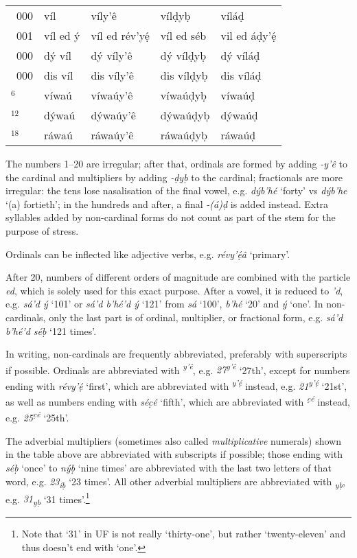 \documentclass[a4paper, 12pt, twoside, openright, final]{book}
\let \nf \normalfont
\let \w \textit
\let \Sub \textsubscript
\let \Sup \textsuperscript
\begin{document}
{\begin{longtable}{>{\nf}l|l|l|l|l}
    1~000  & víl             & víly’ê             & vílḍyḅ            & víláḍ           \\
    1~001  & víl ed ý        & víl ed rév’yẹ́      & víl ed séb        & vil ed áḍy’ẹ́    \\
    2~000  & dý víl          & dý víly’ê          & dý vílḍyḅ         & dý víláḍ        \\
    10~000 & dis víl         & dis víly’ê         & dis vílḍyḅ        & dis víláḍ       \\
    10$^6$ & víwaú           & víwaúy’ê           & víwaúḍyḅ          & víwaúḍ          \\
    10$^{12}$& dýwaú         & dýwaúy’ê           & dýwaúḍyḅ          & dýwaúḍ          \\
    10$^{18}$& ráwaú         & ráwaúy’ê           & ráwaúḍyḅ          & ráwaúḍ          \\
\end{longtable}
}

\noindent
The numbers 1–20 are irregular;
after that, ordinals are formed by adding \w{-y’ê} to the cardinal and multipliers by adding \w{-ḍyḅ} to the cardinal;
fractionals are more irregular: the tens lose nasalisation of the final vowel, e.g. \w{dýb’hé} ‘forty’ vs \w{dýb’he}
‘(a) fortieth’; in the hundreds and after, a final \w{-(á)ḍ} is added instead. Extra syllables added by non-cardinal
forms do not count as part of the stem for the purpose of stress.

Ordinals can be inflected like adjective verbs, e.g. \w{révy’ẹ́â} ‘primary’.

After 20, numbers of different orders of magnitude are combined with the particle \w{ed}, which is solely used for this
exact purpose. After a vowel, it is reduced to \w{’d}, e.g. \w{sá’d ý} ‘101’ or \w{sá’d b’hé’d ý} ‘121’ from \w{sá} ‘100’,
\w{b’hé} ‘20’ and \w{ý} ‘one’. In non-cardinals, only the last part is of ordinal, multiplier,
or fractional form, e.g. \w{sá’d b’hé’d séḅ} ‘121 times’.

In writing, non-cardinals are frequently abbreviated, preferably with superscripts if possible. Ordinals are abbreviated
with \w{\Sup{y’ê}}, e.g. \w{27\Sup{y’ê}} ‘27th’, except for numbers ending
with \w{révy’ẹ́} ‘first’, which are abbreviated with \w{\Sup{y’ẹ́}} instead, e.g. \w{21\Sup{y’ẹ́}} ‘21st’, as
well as numbers ending with \w{séc̣é} ‘fifth’, which are abbreviated with \w{\Sup{c̣é}} instead, e.g. \w{25\Sup{c̣é}}
‘25th’.

The adverbial multipliers (sometimes also called \textit{multiplicative} numerals) shown in the table above are abbreviated with
subscripts if possible; those ending with \w{séḅ} ‘once’ to \w{nýḅ} ‘nine times’ are abbreviated with the last two letters of that
word, e.g. \w{23\Sub{íḅ}} ‘23 times’. All other adverbial multipliers are abbreviated with \w{\Sub{yḅ}}, e.g. \w{31\Sub{yḅ}}
‘31 times’.\footnote{Note that ‘31’ in UF is not really ‘thirty-one’, but rather ‘twenty-eleven’ and thus doesn’t
end with ‘one’.}
\end{document}
